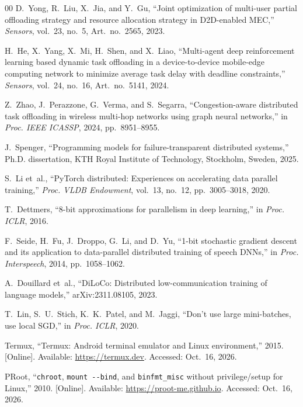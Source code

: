 \documentclass[conference]{IEEEtran}
\begin{document}
\begin{thebibliography}{00}
 D.~Yong, R.~Liu, X.~Jia, and Y.~Gu, ``Joint optimization of multi-user partial offloading strategy and resource allocation strategy in D2D-enabled MEC,'' \textit{Sensors}, vol.~23, no.~5, Art.~no.~2565, 2023.

 H.~He, X.~Yang, X.~Mi, H.~Shen, and X.~Liao, ``Multi-agent deep reinforcement learning based dynamic task offloading in a device-to-device mobile-edge computing network to minimize average task delay with deadline constraints,'' \textit{Sensors}, vol.~24, no.~16, Art.~no.~5141, 2024.

 Z.~Zhao, J.~Perazzone, G.~Verma, and S.~Segarra, ``Congestion-aware distributed task offloading in wireless multi-hop networks using graph neural networks,'' in \textit{Proc. IEEE ICASSP}, 2024, pp.~8951--8955.

 J.~Spenger, ``Programming models for failure-transparent distributed systems,'' Ph.D. dissertation, KTH Royal Institute of Technology, Stockholm, Sweden, 2025.

 S.~Li et~al., ``PyTorch distributed: Experiences on accelerating data parallel training,'' \textit{Proc. VLDB Endowment}, vol.~13, no.~12, pp.~3005--3018, 2020.

 T.~Dettmers, ``8-bit approximations for parallelism in deep learning,'' in \textit{Proc. ICLR}, 2016.

 F.~Seide, H.~Fu, J.~Droppo, G.~Li, and D.~Yu, ``1-bit stochastic gradient descent and its application to data-parallel distributed training of speech DNNs,'' in \textit{Proc. Interspeech}, 2014, pp.~1058--1062.

 A.~Douillard et~al., ``DiLoCo: Distributed low-communication training of language models,'' arXiv:2311.08105, 2023.

 T.~Lin, S.~U.~Stich, K.~K.~Patel, and M.~Jaggi, ``Don't use large mini-batches, use local SGD,'' in \textit{Proc. ICLR}, 2020.

 Termux, ``Termux: Android terminal emulator and Linux environment,'' 2015. [Online]. Available: \url{https://termux.dev}. Accessed: Oct.~16, 2026.

 PRoot, ``\texttt{chroot}, \texttt{mount -{}-bind}, and \texttt{binfmt\_misc} without privilege/setup for Linux,'' 2010. [Online]. Available: \url{https://proot-me.github.io}. Accessed: Oct.~16, 2026.


\end{thebibliography}
\end{document}
